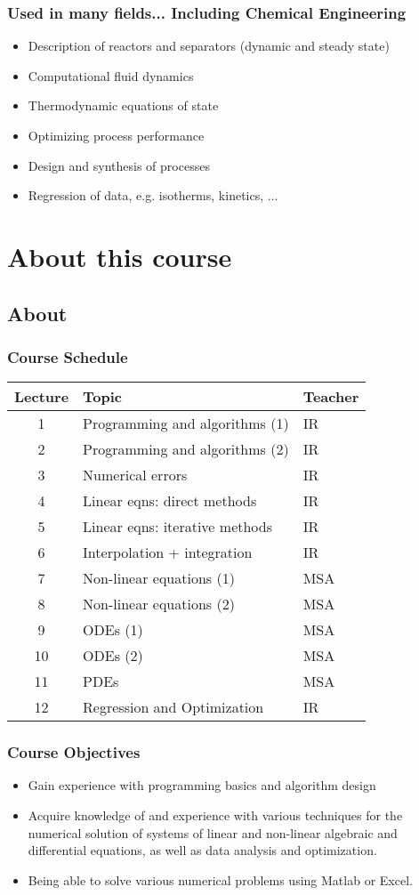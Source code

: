 \begin{frame}
 \frametitle{Used in many fields... Including Chemical Engineering}
  \begin{itemize}
	  \item Description of reactors and separators (dynamic and steady state)
		\item Computational fluid dynamics
		\item Thermodynamic equations of state
		\item Optimizing process performance
		\item Design and synthesis of processes
		\item Regression of data, e.g. isotherms, kinetics, ...
 \end{itemize}
\end{frame}

\section{About this course}
\subsection{About}
\begin{frame}
  \frametitle{Course Schedule}
  \centering
  \begin{tabular}{cll}
  \hline
  Lecture  & Topic & Teacher \\ 
  \hline
  1 & Programming and algorithms (1) & IR \\ 
  2 & Programming and algorithms (2) & IR \\ 
  3 & Numerical errors & IR \\ 
  4 & Linear eqns: direct methods & IR\\ 
  5 & Linear eqns: iterative methods & IR \\ 
  6 & Interpolation + integration & IR \\ 
  7 & Non-linear equations (1) & MSA \\ 
  8 & Non-linear equations (2) & MSA\\ 
  9 & ODEs (1) & MSA \\
  10 & ODEs (2) & MSA \\ 
  11 & PDEs & MSA \\ 
  12 & Regression and Optimization & IR \\ 
  \hline
  \end{tabular} 
 \end{frame}

\begin{frame}
 \frametitle{Course Objectives}
 \begin{itemize}
  \item Gain experience with programming basics and algorithm design
  \item Acquire knowledge of and experience with various techniques for the numerical solution of systems of linear and non-linear algebraic and differential equations, as well as data analysis and optimization.
  \item Being able to solve various numerical problems using Matlab or Excel. 
 \end{itemize}
\end{frame}


